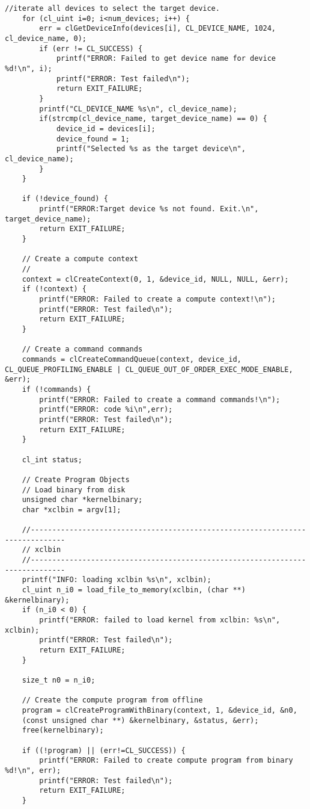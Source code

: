 \begin{lstlisting}[label=lst:lev_rec,caption=Содержимое файла host\_example.cpp]
	//iterate all devices to select the target device.
	for (cl_uint i=0; i<num_devices; i++) {
		err = clGetDeviceInfo(devices[i], CL_DEVICE_NAME, 1024, cl_device_name, 0);
		if (err != CL_SUCCESS) {
			printf("ERROR: Failed to get device name for device %d!\n", i);
			printf("ERROR: Test failed\n");
			return EXIT_FAILURE;
		}
		printf("CL_DEVICE_NAME %s\n", cl_device_name);
		if(strcmp(cl_device_name, target_device_name) == 0) {
			device_id = devices[i];
			device_found = 1;
			printf("Selected %s as the target device\n", cl_device_name);
		}
	}
	
	if (!device_found) {
		printf("ERROR:Target device %s not found. Exit.\n", target_device_name);
		return EXIT_FAILURE;
	}
	
	// Create a compute context
	//
	context = clCreateContext(0, 1, &device_id, NULL, NULL, &err);
	if (!context) {
		printf("ERROR: Failed to create a compute context!\n");
		printf("ERROR: Test failed\n");
		return EXIT_FAILURE;
	}
	
	// Create a command commands
	commands = clCreateCommandQueue(context, device_id, CL_QUEUE_PROFILING_ENABLE | CL_QUEUE_OUT_OF_ORDER_EXEC_MODE_ENABLE, &err);
	if (!commands) {
		printf("ERROR: Failed to create a command commands!\n");
		printf("ERROR: code %i\n",err);
		printf("ERROR: Test failed\n");
		return EXIT_FAILURE;
	}
	
	cl_int status;
	
	// Create Program Objects
	// Load binary from disk
	unsigned char *kernelbinary;
	char *xclbin = argv[1];
	
	//------------------------------------------------------------------------------
	// xclbin
	//------------------------------------------------------------------------------
	printf("INFO: loading xclbin %s\n", xclbin);
	cl_uint n_i0 = load_file_to_memory(xclbin, (char **) &kernelbinary);
	if (n_i0 < 0) {
		printf("ERROR: failed to load kernel from xclbin: %s\n", xclbin);
		printf("ERROR: Test failed\n");
		return EXIT_FAILURE;
	}
	
	size_t n0 = n_i0;
	
	// Create the compute program from offline
	program = clCreateProgramWithBinary(context, 1, &device_id, &n0,
	(const unsigned char **) &kernelbinary, &status, &err);
	free(kernelbinary);
	
	if ((!program) || (err!=CL_SUCCESS)) {
		printf("ERROR: Failed to create compute program from binary %d!\n", err);
		printf("ERROR: Test failed\n");
		return EXIT_FAILURE;
	}
	

\end{lstlisting}
